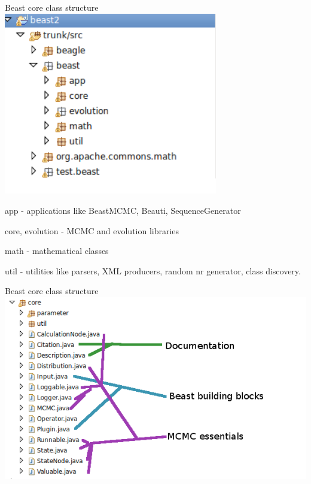 \documentclass{beamer}
\theoremstyle{definition}
\begin{document}
\begin{frame}{Beast core class structure}
\includegraphics[width=0.7\textwidth]{classes2.png}

app - applications like BeastMCMC, Beauti, SequenceGenerator

core, evolution - MCMC and evolution libraries

math - mathematical classes

util - utilities like parsers, XML producers, random nr generator, class discovery.

\end{frame}

\begin{frame}{Beast core class structure}
\includegraphics[width=\textwidth]{classes3.png}
\end{frame}
\end{document}
